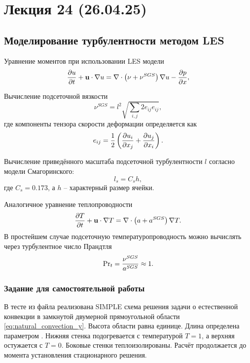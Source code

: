 \section{Лекция 24 (26.04.25)}

\subsection{Моделирование турбулентности методом LES}
Уравнение моментов при использовании LES модели
\begin{equation*}
\frac{\partial u}{\partial t} + \boldsymbol{\rm u}\cdot\nabla u = \nabla \cdot \left(\nu + \nu^{SGS}\right)\nabla u - \frac{\partial p}{\partial x},
\end{equation*}

Вычисление подсеточной вязкости
\begin{equation}
\label{eq:nu_sgs}
\nu^{SGS}=l^2 \sqrt{\sum_{i,j}2 e_{ij} e_{ij}},
\end{equation}
где компоненты тензора скорости деформации определяется как
\begin{equation*}
e_{ij} = \frac12\left(\frac{\partial u_i}{\partial x_j} + \frac{\partial u_j}{\partial x_i}\right).
\end{equation*}

Вычисление приведённого масштаба подсеточной турбулентности $l$ согласно модели Смагоринского:
\begin{equation}
\label{eq:nu_sgs_smagor}
l_s = C_s h, 
\end{equation}
где $C_s = 0.173$, а $h$ -- характерный размер ячейки.

Аналогичное уравнение теплопроводности
\begin{equation*}
\frac{\partial T}{\partial t} + \boldsymbol{\rm u}\cdot\nabla T = \nabla \cdot \left(a + a^{SGS}\right)\nabla T.
\end{equation*}
В простейшем случае подсеточную температуропроводность можно вычислять через турбулентное число Прандтля
\begin{equation*}
{\rm Pr}_t = \frac{\nu^{SGS}}{a^{SGS}} \approx 1.
\end{equation*}


\subsubsection{Задание для самостоятельной работы}
В тесте  из файла 
реализована SIMPLE схема решения задачи о естественной конвекции в замкнутой двумерной прямоугольной области \cref{eq:natural_convection_y}.
Высота области равна единице. Длина определена параметром .
Нижняя стенка подогревается с температурой $T=1$, а верхняя остужается с $T=0$. Боковые стенки теплоизолированы.
Расчёт продолжается до момента установления стационарного решения.

